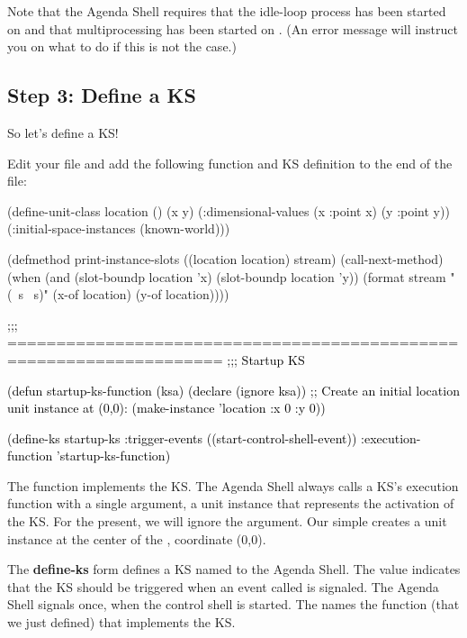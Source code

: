\documentclass[10pt,twoside,english,pdftex]{article}
\begin{document}
Note that the Agenda Shell requires that the idle-loop process has been
started on  and that
multiprocessing has been started on
.  (An error message will
instruct you on what to do if this is not the case.)

\subsection*{Step 3: Define a KS}

So let's define a KS!

%
%
Edit your  file and add the following function
and KS definition to the end of the  file:
%
\W\supp
\begin{example}
\textcolor{darkergray}{%
  (define-unit-class location ()
    (x y)
    (:dimensional-values
      (x :point x)
      (y :point y))
    (:initial-space-instances (known-world)))

  (defmethod print-instance-slots ((location location) stream)
    (call-next-method)
    (when (and (slot-boundp location 'x)
               (slot-boundp location 'y))
      (format stream " (~s ~s)"
              (x-of location)
              (y-of location))))

  \textcolor{black}{;;; ====================================================================
  ;;;   Startup KS

  (defun startup-ks-function (ksa)
    (declare (ignore ksa))
    ;; Create an initial location unit instance at (0,0):
    (make-instance 'location :x 0 :y 0))

  (define-ks startup-ks
      :trigger-events ((start-control-shell-event))
      :execution-function 'startup-ks-function)}}
\end{example}

The function  implements the KS.  The Agenda Shell
always calls a KS's execution function with a single argument, a 
unit instance that represents the activation of the KS.  For the present, we
will ignore the  argument.  Our simple 
creates a  unit instance at the center of the
, coordinate (0,0).

The \textbf{define-ks} form defines a KS named  to the
Agenda Shell.  The  value indicates that the KS should
be triggered when an event called  is
signaled.  The Agenda Shell signals  once,
when the control shell is started.  The  names the
function (that we just defined) that implements the KS.
\end{document}
